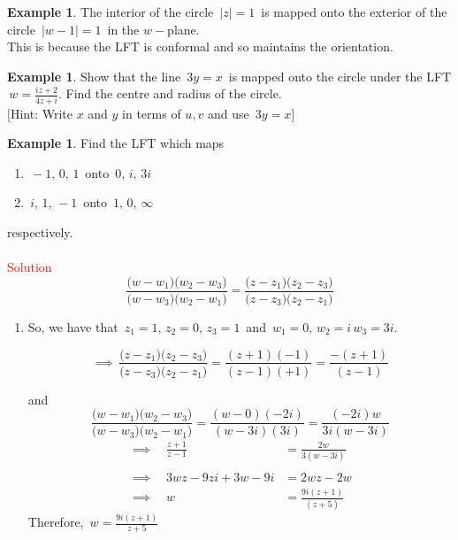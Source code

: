 \documentclass[11pt,a4paper]{article}
\theoremstyle{definition}
\newtheorem{example}[thm]{Example}
\begin{document}
\begin{example}
The interior of the circle $\,\left|z\right| = 1\,$ is mapped onto the exterior of the circle $\,\left|w - 1\right|=1\,$ in the $w-$plane.\\
This is because the LFT is conformal and so maintains the orientation.
\end{example}

\begin{example}
Show that the line $\, 3y = x\,$ is mapped onto the circle under the LFT $\, w = \frac{iz + 2}{4z + i}.$ Find the centre and radius of the circle.\\
$\big[$Hint: Write $x$ and $y$ in terms of $u, v$ and use $\, 3y  = x \big]$
\end{example}

\begin{example}
Find the LFT which maps 
\begin{enumerate}
\item[(a).] $\, - 1, \, 0, \, 1\,$ onto $\, 0, \, i, \, 3i$

\item[(b).] $\, i, \, 1, \, -1\,$ onto $\, 1, \, 0, \, \infty$
\end{enumerate}
respectively.\\\\





\textcolor{red}{Solution}
$$\frac{\big(w - w_1\big)\big(w_2 - w_3\big)}{\big(w - w_3\big)\big(w_2 - w_1\big)} = \frac{\big(z - z_1\big)\big(z_2 - z_3\big)}{\big(z - z_3\big)\big(z_2 - z_1\big)}$$

\begin{enumerate}
\item[(a).] So, we have that $\, z_1 = 1,\, z_2 = 0, \, z_3 = 1\,$ and $\, w_1 = 0, \, w_2 = i\, w_3 = 3i$.

$$\implies\, \frac{\big(z - z_1\big)\big(z_2 - z_3\big)}{\big(z - z_3\big)\big(z_2 - z_1\big)} = \frac{(z + 1) (-1)}{(z - 1) (+ 1)} = \frac{-(z + 1)}{(z - 1)} $$

and
$$\frac{\big(w - w_1\big)\big(w_2 - w_3\big)}{\big(w - w_3\big)\big(w_2 - w_1\big)} = \frac{(w - 0)(-2i)}{(w - 3i)(3i)} = \frac{(-2i)w}{3i(w - 3i)}$$
\begin{align*}
\implies \quad  \frac{z + 1}{z - 1} & = \frac{2w}{3 (w - 3i)}\\\\
\implies \quad  3wz - 9zi + 3w - 9i & = 2wz - 2w\\
\implies\quad  w & = \frac{9i ( z + 1)}{(z + 5)}
\end{align*}
Therefore, $\, w = \frac{9i( z+ 1)}{z + 5}$\\




\end{enumerate}
\end{example}
\end{document}
